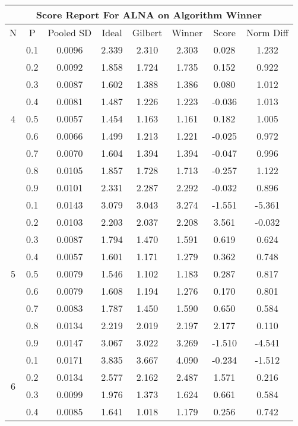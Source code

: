 \documentclass[11pt,a4paper]{report}
\begin{document}
\begin{longtable}{ | c | c || c | c | c | c | c | c | }
\hline
\multicolumn{8}{|c|}{ Score Report For ALNA on Algorithm Winner} \\
\hline
N & P & Pooled SD &  Ideal &  Gilbert & Winner  & Score & Norm Diff \\
 \hline
 \hline
 \endhead
\multirow{9}{*}{4} & 0.1 & 0.0096 & 2.339 & 2.310 & 2.303 & 0.028 & 1.232 \\
 & 0.2 & 0.0092 & 1.858 & 1.724 & 1.735 & 0.152 & 0.922 \\
 & 0.3 & 0.0087 & 1.602 & 1.388 & 1.386 & 0.080 & 1.012 \\
 & 0.4 & 0.0081 & 1.487 & 1.226 & 1.223 & -0.036 & 1.013 \\
 & 0.5 & 0.0057 & 1.454 & 1.163 & 1.161 & 0.182 & 1.005 \\
 & 0.6 & 0.0066 & 1.499 & 1.213 & 1.221 & -0.025 & 0.972 \\
 & 0.7 & 0.0070 & 1.604 & 1.394 & 1.394 & -0.047 & 0.996 \\
 & 0.8 & 0.0105 & 1.857 & 1.728 & 1.713 & -0.257 & 1.122 \\
 & 0.9 & 0.0101 & 2.331 & 2.287 & 2.292 & -0.032 & 0.896 \\
 \hline
\multirow{9}{*}{5} & 0.1 & 0.0143 & 3.079 & 3.043 & 3.274 & -1.551 & -5.361 \\
 & 0.2 & 0.0103 & 2.203 & 2.037 & 2.208 & 3.561 & -0.032 \\
 & 0.3 & 0.0087 & 1.794 & 1.470 & 1.591 & 0.619 & 0.624 \\
 & 0.4 & 0.0057 & 1.601 & 1.171 & 1.279 & 0.362 & 0.748 \\
 & 0.5 & 0.0079 & 1.546 & 1.102 & 1.183 & 0.287 & 0.817 \\
 & 0.6 & 0.0079 & 1.608 & 1.194 & 1.276 & 0.170 & 0.801 \\
 & 0.7 & 0.0083 & 1.787 & 1.450 & 1.590 & 0.650 & 0.584 \\
 & 0.8 & 0.0134 & 2.219 & 2.019 & 2.197 & 2.177 & 0.110 \\
 & 0.9 & 0.0147 & 3.067 & 3.022 & 3.269 & -1.510 & -4.541 \\
 \hline
\multirow{9}{*}{6} & 0.1 & 0.0171 & 3.835 & 3.667 & 4.090 & -0.234 & -1.512 \\
 & 0.2 & 0.0134 & 2.577 & 2.162 & 2.487 & 1.571 & 0.216 \\
 & 0.3 & 0.0099 & 1.976 & 1.373 & 1.624 & 0.661 & 0.584 \\
 & 0.4 & 0.0085 & 1.641 & 1.018 & 1.179 & 0.256 & 0.742 \\

\end{longtable}
\end{document}
